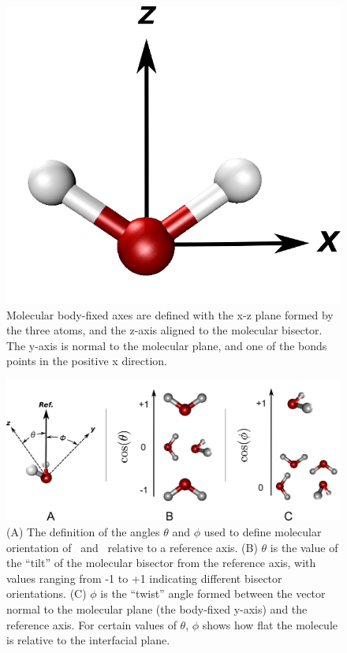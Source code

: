 \begin{figure}[h!]
	\begin{center}
		\includegraphics[scale=1.0]{images/angle-cartoons/molecularframesmall.png}
		\caption{Molecular body-fixed axes are defined with the x-z plane formed by the three atoms, and the z-axis aligned to the molecular bisector. The y-axis is normal to the molecular plane, and one of the bonds points in the positive x direction.}
		\label{fig:molecular-frame}
	\end{center}
\end{figure}

\begin{figure}[h!]
	\begin{center}
		\includegraphics[scale=1.0]{images/angle-cartoons/molecular-angles.png}
		\caption{(A) The definition of the angles $\theta$ and $\phi$ used to define molecular orientation of \suldiox~and \wat~relative to a reference axis. (B) $\theta$ is the value of the ``tilt'' of the molecular bisector from the reference axis, with values ranging from -1 to +1 indicating different bisector orientations. (C) $\phi$ is the ``twist'' angle formed between the vector normal to the molecular plane (the body-fixed y-axis) and the reference axis. For certain values of $\theta$, $\phi$ shows how flat the molecule is relative to the interfacial plane.}
		\label{fig:water-angles}
	\end{center}
\end{figure}

